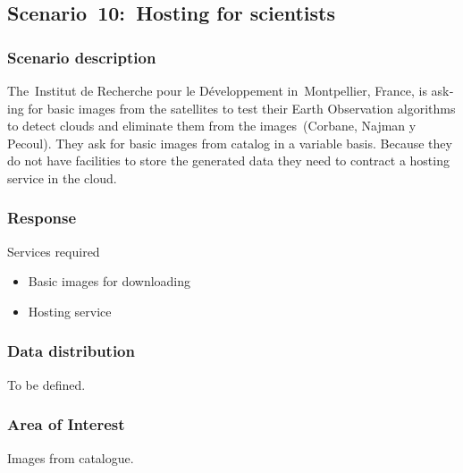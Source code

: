 \documentclass[a4paper]{article}
\newcommand\liststyleLFOix{%
\renewcommand\labelitemi{[F0B7?]}
\renewcommand\labelitemii{o}
\renewcommand\labelitemiii{[F0A7?]}
\renewcommand\labelitemiv{[F0B7?]}
}
\begin{document}
\bigskip


\bigskip


\bigskip

\clearpage
\bigskip

\subsection[Scenario\ 10:\ Hosting for
scientists]{\foreignlanguage{spanish}{Scenario\ }\foreignlanguage{spanish}{10}\foreignlanguage{spanish}{:\ }\foreignlanguage{english}{Hosting
for scientists}}
\hypertarget{Toc381777293}{}\subsubsection[Scenario
description]{ Scenario description}
\hypertarget{Toc381777294}{}\foreignlanguage{english}{The\ }\foreignlanguage{english}{Institut
de R}\foreignlanguage{english}{echerche pour le D\'eveloppement
in}\foreignlanguage{english}{\ Montpellier,
France}\foreignlanguage{english}{, is asking for basic images from the
satellites to test their Earth Observation algorithms to detect clouds
and eliminate them from the images\ }(Corbane, Najman y
Pecoul)\foreignlanguage{english}{. They ask for basic images from
catalog in a variable basis. Because they do not have facilities to
store the generated data they need to contract a hosting service in the
cloud.}

\subsubsection[Response]{ Response}
\hypertarget{Toc381777295}{}{
Services required}

\liststyleLFOix
\begin{itemize}
\item {
Basic images for downloading}
\item {
Hosting service}
\end{itemize}
\subsubsection[Data distribution]{ Data
distribution}
\hypertarget{Toc381777296}{}{
To be defined.}

\subsubsection[Area of Interest\ ]{ Area of
Interest\ }
\hypertarget{Toc381777297}{}{
Images from catalogue.}
\end{document}
